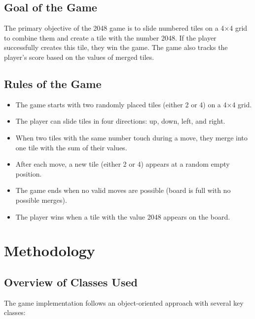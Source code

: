\documentclass[12pt, a4paper]{article}
\begin{document}
\subsection{Goal of the Game}
The primary objective of the 2048 game is to slide numbered tiles on a 4×4 grid to combine them and create a tile with the number 2048. If the player successfully creates this tile, they win the game. The game also tracks the player's score based on the values of merged tiles.

\subsection{Rules of the Game}
\begin{itemize}
    \item The game starts with two randomly placed tiles (either 2 or 4) on a 4×4 grid.
    \item The player can slide tiles in four directions: up, down, left, and right.
    \item When two tiles with the same number touch during a move, they merge into one tile with the sum of their values.
    \item After each move, a new tile (either 2 or 4) appears at a random empty position.
    \item The game ends when no valid moves are possible (board is full with no possible merges).
    \item The player wins when a tile with the value 2048 appears on the board.
\end{itemize}

\section{Methodology}

\subsection{Overview of Classes Used}
The game implementation follows an object-oriented approach with several key classes:
\end{document}
